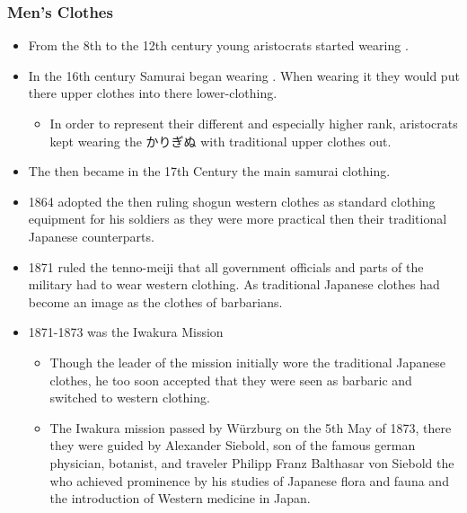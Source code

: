 \documentclass{article}
\begin{document}
\subsubsection*{Men's Clothes}
\begin{itemize}
    \item From the 8th to the 12th century young aristocrats started wearing . 
    \item In the 16th century Samurai began wearing . When wearing it they would put there upper clothes into there lower-clothing.
    \begin{itemize}
        \item In order to represent their different and especially higher rank, aristocrats kept wearing the かりぎぬ with traditional upper clothes out.
    \end{itemize}
    \item The  then became in the 17th Century the main samurai clothing.
    \item 1864 adopted the then ruling shogun western clothes as standard clothing equipment for his soldiers as they were more practical then their traditional Japanese counterparts.
    \item 1871 ruled the tenno-meiji that all government officials and parts of the military had to wear western clothing. As traditional Japanese clothes had become an image as the clothes of barbarians.
    \item 1871-1873 was the Iwakura Mission
    \begin{itemize}
        \item Though the leader of the mission initially wore the traditional Japanese clothes, he too soon accepted that	
        they were seen as barbaric and switched to western clothing.
        \item The Iwakura mission passed by Würzburg on the 5th May of 1873, there they were guided by Alexander Siebold,	
        son of the famous german physician, botanist, and traveler Philipp Franz Balthasar von Siebold the who achieved 	prominence by his studies of Japanese flora and fauna and the introduction of Western medicine in Japan.
    \end{itemize}
\end{itemize}
\end{document}
